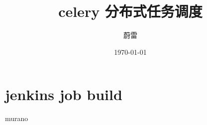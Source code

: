 \documentclass[11pt,a4paper]{article}
\title{celery 分布式任务调度}
\author{蔚雷}
\date{\today}
\begin{document}
\maketitle

\tableofcontents 
\newpage


\section{jenkins job build}

murano 
\end{document}
